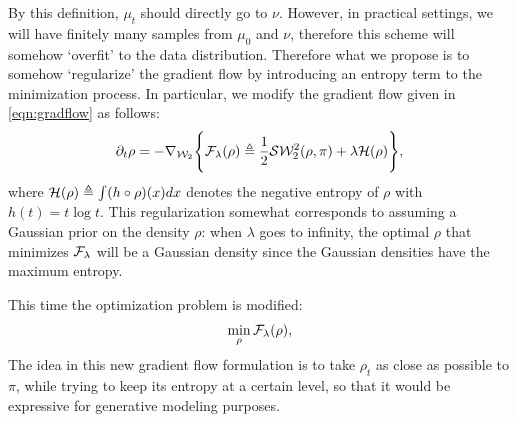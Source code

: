 
By this definition, $\mu_t$ should directly go to $\nu$. However, in practical settings, we will have finitely many samples from $\mu_0$ and $\nu$, therefore this scheme will somehow `overfit' to the data distribution. Therefore what we propose is to somehow `regularize' the gradient flow by introducing an entropy term to the minimization process. In particular, we modify the gradient flow given in \eqref{eqn:gradflow} as follows:
\begin{align}
\partial_t \rho = - \nabla_{{\cal W}_2} \Biggl\{ {\cal F}_\lambda(\rho) \triangleq  \frac1{2} {\cal S}{\cal W}_2^2(\rho, \pi) + \lambda {\cal H}(\rho) \Biggr\},
\end{align}
where ${\cal H}(\rho) \triangleq \int (h \circ \rho) (x) dx $ denotes the negative entropy of $\rho$ with $h(t) = t \log t$. This regularization somewhat corresponds to assuming a Gaussian prior on the density $\rho$: when $\lambda$ goes to infinity, the optimal $\rho$ that minimizes ${\cal F}_\lambda$ will be a Gaussian density since the Gaussian densities have the maximum entropy.


This time the optimization problem is modified:
\begin{align}
\min_\rho {\cal F}_\lambda(\rho),
\end{align}
The idea in this new gradient flow formulation is to take $\rho_t$ as close as possible to $\pi$, while trying to keep its entropy at a certain level, so that it would be expressive for generative modeling purposes.



